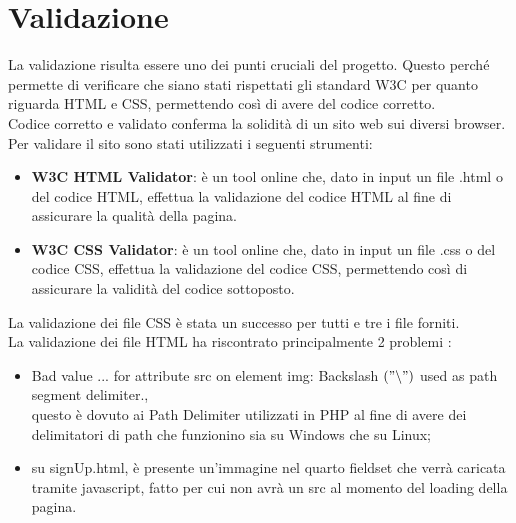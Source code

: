 \section{Validazione}
La validazione risulta essere uno dei punti cruciali del progetto. Questo perché permette di verificare che siano stati rispettati gli standard W3C per quanto riguarda HTML e CSS, permettendo così di avere del codice corretto.\\
Codice corretto e validato conferma la solidità di un sito web sui diversi browser. \\
Per validare il sito sono stati utilizzati i seguenti strumenti:
\begin{itemize}
	\item \textbf{W3C HTML Validator}: è un tool online che, dato in input un file .html o del codice HTML, effettua la validazione del codice HTML al fine di assicurare la qualità della pagina.
	\item \textbf{W3C CSS Validator}: è un tool online che, dato in input un file .css o del codice CSS, effettua la validazione del codice CSS, permettendo così di assicurare la validità del codice sottoposto.
\end{itemize}

La validazione dei file CSS è stata un successo per tutti e tre i file forniti. \\
La validazione dei file HTML ha riscontrato principalmente 2 problemi :
\begin{itemize}
  \item Bad value ... for attribute src on element img: Backslash $("\backslash")$ used as path segment delimiter., \\ questo è dovuto ai Path Delimiter utilizzati in PHP al fine di avere dei delimitatori di path che funzionino sia su Windows che su Linux;
  \item su signUp.html, è presente un'immagine nel quarto fieldset che verrà caricata tramite javascript, fatto per cui non avrà un src al momento del loading della pagina.
\end{itemize}